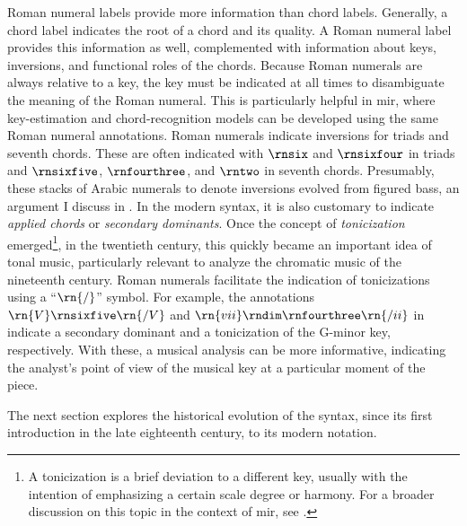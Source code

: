 

Roman numeral labels provide more information than chord
labels. Generally, a chord label indicates the root of a
chord and its quality. A Roman numeral label provides this
information as well, complemented with information about
keys, inversions, and functional roles of the chords.
Because Roman numerals are always relative to a key, the key
must be indicated at all times to disambiguate the meaning
of the Roman numeral. This is particularly helpful in
\gls{mir}, where key-estimation and chord-recognition models
can be developed using the same Roman numeral annotations.
Roman numerals indicate inversions for triads and seventh
chords. These are often indicated with $\rnsix$ and
$\rnsixfour$ in triads and $\rnsixfive$, $\rnfourthree$, and
$\rntwo$ in seventh chords. Presumably, these stacks of
Arabic numerals to denote inversions evolved from figured
bass, an argument I discuss in
. In the modern
syntax, it is also customary to indicate \emph{applied
chords} or \emph{secondary dominants}. Once the concept of
\emph{tonicization} emerged\footnote{A tonicization is a
brief deviation to a different key, usually with the
intention of emphasizing a certain scale degree or harmony.
For a broader discussion on this topic in the context of \gls{mir}, see
\textcite{napoleslopez2020local}. }, in the twentieth
century, this quickly became an important idea of tonal
music, particularly relevant to analyze the chromatic music
of the nineteenth century. Roman numerals facilitate the
indication of tonicizations using a ``$\rn{/}$'' symbol. For
example, the annotations $\rn{V}\rnsixfive\rn{/V}$ and
$\rn{vii}\rndim\rnfourthree\rn{/ii}$ in 
indicate a secondary dominant and a tonicization of the
G-minor key, respectively. With these, a musical analysis
can be more informative, indicating the analyst's point of
view of the musical key at a particular moment of the piece.

The next section explores the historical evolution of the
syntax, since its first introduction in the late eighteenth
century, to its modern notation.

